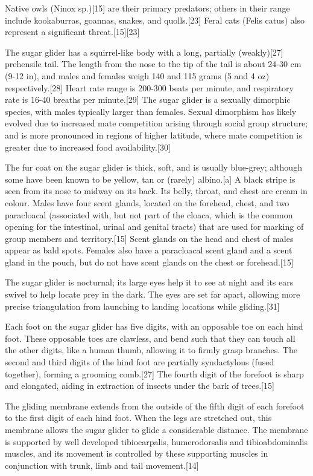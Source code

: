 \documentclass[twoside, 12pt, letterpaper]{report}\usepackage[]{graphicx}\usepackage[]{color}
\begin{document}
\begin{multicols*}{2}
Native owls (Ninox sp.)[15] are their primary predators; others in their range include kookaburras, goannas, snakes, and quolls.[23] Feral cats (Felis catus) also represent a significant threat.[15][23]

The sugar glider has a squirrel-like body with a long, partially (weakly)[27] prehensile tail. The length from the nose to the tip of the tail is about 24-30 cm (9-12 in), and males and females weigh 140 and 115 grams (5 and 4 oz) respectively.[28] Heart rate range is 200-300 beats per minute, and respiratory rate is 16-40 breaths per minute.[29] The sugar glider is a sexually dimorphic species, with males typically larger than females. Sexual dimorphism has likely evolved due to increased mate competition arising through social group structure; and is more pronounced in regions of higher latitude, where mate competition is greater due to increased food availability.[30]

The fur coat on the sugar glider is thick, soft, and is usually blue-grey; although some have been known to be yellow, tan or (rarely) albino.[a] A black stripe is seen from its nose to midway on its back. Its belly, throat, and chest are cream in colour. Males have four scent glands, located on the forehead, chest, and two paracloacal (associated with, but not part of the cloaca, which is the common opening for the intestinal, urinal and genital tracts) that are used for marking of group members and territory.[15] Scent glands on the head and chest of males appear as bald spots. Females also have a paracloacal scent gland and a scent gland in the pouch, but do not have scent glands on the chest or forehead.[15]

The sugar glider is nocturnal; its large eyes help it to see at night and its ears swivel to help locate prey in the dark. The eyes are set far apart, allowing more precise triangulation from launching to landing locations while gliding.[31]

Each foot on the sugar glider has five digits, with an opposable toe on each hind foot. These opposable toes are clawless, and bend such that they can touch all the other digits, like a human thumb, allowing it to firmly grasp branches. The second and third digits of the hind foot are partially syndactylous (fused together), forming a grooming comb.[27] The fourth digit of the forefoot is sharp and elongated, aiding in extraction of insects under the bark of trees.[15]

The gliding membrane extends from the outside of the fifth digit of each forefoot to the first digit of each hind foot. When the legs are stretched out, this membrane allows the sugar glider to glide a considerable distance. The membrane is supported by well developed tibiocarpalis, humerodorsalis and tibioabdominalis muscles, and its movement is controlled by these supporting muscles in conjunction with trunk, limb and tail movement.[14]


\end{multicols*}
\end{document}
